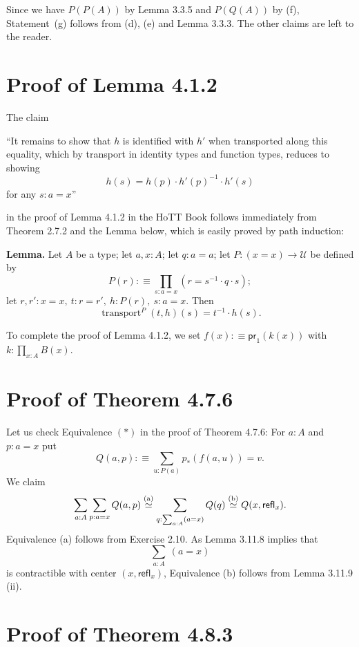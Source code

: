 \documentclass[12pt]{article}
\newcommand{\msf}{\mathsf}
\newcommand{\ee}{\equiv}
\newcommand{\nn}{\noindent}
\newcommand{\oo}{\operatorname}
\newcommand{\refl}{\mathsf{refl}}
\newcommand{\two}{\mathbf2}
\newcommand{\U}{\mathcal U}
\begin{document}
Since we have $P(P(A))$ by Lemma 3.3.5 and $P(Q(A))$ by (f), Statement~(g) follows from (d), (e) and Lemma 3.3.3. The other claims are left to the reader.


\section{Proof of Lemma 4.1.2}

The claim

\nn ``It remains to show that $h$ is identified with $h'$ when transported along this equality, which by transport in identity types and function types, reduces to showing 
$$
h(s)=h(p)\cdot h'(p)^{-1}\cdot h'(s)
$$ 
for any $s:a=x$''

\nn in the proof of Lemma 4.1.2 in the HoTT Book follows immediately from Theorem 2.7.2 and the Lemma below, which is easily proved by path induction:

\nn \textbf{Lemma.} Let $A$ be a type; let $a,x:A$; let $q:a=a$; let $P:(x=x)\to\U$ be defined by 
$$
P(r):\equiv\prod_{s:a=x}(r=s^{-1}\cdot q\cdot s);
$$ 
let $r,r':x=x,\ t:r=r',\ h:P(r),\ s:a=x$. Then 
$$
\oo{transport}^P(t,h)(s)=t^{-1}\cdot h(s).
$$ 

To complete the proof of Lemma 4.1.2, we set $f(x):\ee\msf{pr}_1(k(x))$ with $k:\prod_{x:A}B(x)$.





\section{Proof of Theorem 4.7.6}

Let us check Equivalence $(*)$ in the proof of Theorem 4.7.6: For $a:A$ and $p:a=x$ put 
$$
Q(a,p):\equiv\sum_{u:P(a)}p_*(f(a,u))=v.
$$ 
We claim 
$$
\sum_{a:A}\sum_{p:a=x}Q(a,p)\overset{(\text a)}{\simeq}
\sum_{q:\sum_{a:A}(a=x)}Q(q)\overset{(\text b)}{\simeq}
Q(x,\refl_x).
$$
Equivalence (a) follows from Exercise 2.10. As Lemma 3.11.8 implies that $$\sum_{a:A}\ (a=x)$$ is contractible with center $(x,\refl_x)$, Equivalence (b) follows from Lemma 3.11.9 (ii). 


\section{Proof of Theorem 4.8.3}
\end{document}
